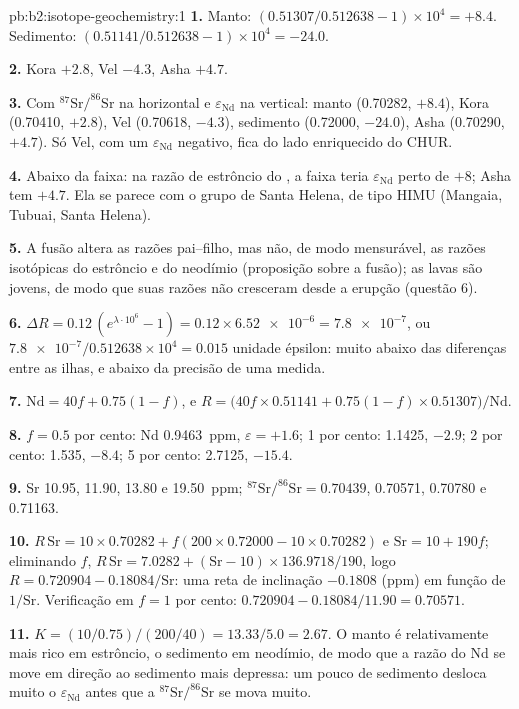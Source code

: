 \begin{solution}{pb:b2:isotope-geochemistry:1}
\textbf{1.} Manto: $(0.51307/0.512638 - 1)\times10^4 = +8.4$. Sedimento:
$(0.51141/0.512638 - 1)\times10^4 = -24.0$.

\textbf{2.} Kora $+2.8$, Vel $-4.3$, Asha $+4.7$.

\textbf{3.} Com $^{87}\mathrm{Sr}/^{86}\mathrm{Sr}$ na horizontal e $\varepsilon_{\mathrm{Nd}}$ na vertical:
manto (0.70282, $+8.4$), Kora (0.70410, $+2.8$), Vel (0.70618, $-4.3$), sedimento
(0.72000, $-24.0$), Asha (0.70290, $+4.7$). Só Vel, com um
$\varepsilon_{\mathrm{Nd}}$ negativo, fica do lado enriquecido do CHUR.

\textbf{4.} Abaixo da faixa: na razão de estrôncio do , a faixa
teria $\varepsilon_{\mathrm{Nd}}$ perto de $+8$; Asha tem $+4.7$. Ela se parece com o
grupo de Santa Helena, de tipo HIMU (Mangaia, Tubuai, Santa Helena).

\textbf{5.} A fusão altera as razões pai--filho, mas não, de modo mensurável, as
razões isotópicas do estrôncio e do neodímio (proposição sobre a fusão); as lavas são
jovens, de modo que suas razões não cresceram desde a erupção (questão 6).

\textbf{6.} $\Delta R = 0.12\,(e^{\lambda\cdot10^6} - 1) = 0.12\times\num{6.52e-6} =
\num{7.8e-7}$, ou $\num{7.8e-7}/0.512638\times10^4 = 0.015$ unidade épsilon: muito abaixo das
diferenças entre as ilhas, e abaixo da precisão de uma medida.

\textbf{7.} $\mathrm{Nd} = 40f + 0.75(1-f)$, e
$R = \bigl(40f\times0.51141 + 0.75(1-f)\times0.51307\bigr)/\mathrm{Nd}$.

\textbf{8.} $f = 0.5$ por cento: Nd \qty{0.9463}{ppm}, $\varepsilon = +1.6$; 1 por cento:
1.1425, $-2.9$; 2 por cento: 1.535, $-8.4$; 5 por cento: 2.7125, $-15.4$.

\textbf{9.} Sr 10.95, 11.90, 13.80 e \qty{19.50}{ppm}; $^{87}\mathrm{Sr}/^{86}\mathrm{Sr} =
0.70439$, 0.70571, 0.70780 e 0.71163.

\textbf{10.} $R\,\mathrm{Sr} = 10\times0.70282 + f(200\times0.72000 - 10\times0.70282)$ e
$\mathrm{Sr} = 10 + 190f$; eliminando $f$, $R\,\mathrm{Sr} = 7.0282 +
(\mathrm{Sr}-10)\times136.9718/190$, logo $R = 0.720904 - 0.18084/\mathrm{Sr}$: uma
reta de inclinação $-0.1808$ (ppm) em função de $1/\mathrm{Sr}$. Verificação em $f = 1$ por cento:
$0.720904 - 0.18084/11.90 = 0.70571$.

\textbf{11.} $K = (10/0.75)/(200/40) = 13.33/5.0 = 2.67$. O manto é relativamente
mais rico em estrôncio, o sedimento em neodímio, de modo que a razão do Nd se move em direção ao
sedimento mais depressa: um pouco de sedimento desloca muito o $\varepsilon_{\mathrm{Nd}}$ antes que
a $^{87}\mathrm{Sr}/^{86}\mathrm{Sr}$ se mova muito.


\end{solution}
